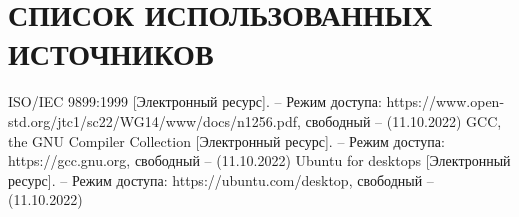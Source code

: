\section*{СПИСОК ИСПОЛЬЗОВАННЫХ ИСТОЧНИКОВ}

\begingroup
\renewcommand{\section}[2]{}
\begin{thebibliography}{}
	ISO/IEC 9899:1999 [Электронный ресурс]. – Режим доступа:
	https://www.open-std.org/jtc1/sc22/WG14/www/docs/n1256.pdf,
	свободный – (11.10.2022)
	GCC, the GNU Compiler Collection [Электронный ресурс]. – Режим доступа:
	https://gcc.gnu.org,
	свободный – (11.10.2022)
	Ubuntu for desktops [Электронный ресурс]. – Режим доступа:
	https://ubuntu.com/desktop,
	свободный – (11.10.2022)
\end{thebibliography}
\endgroup

\pagebreak